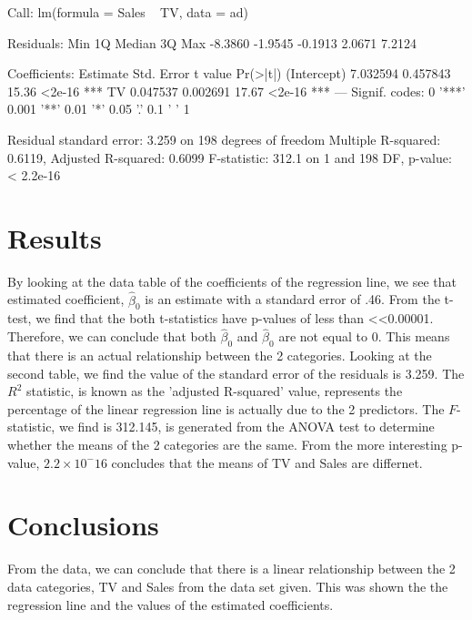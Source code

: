 \documentclass{article}
\begin{document}
\begin{Schunk}
\begin{Soutput}
Call:
lm(formula = Sales ~ TV, data = ad)

Residuals:
    Min      1Q  Median      3Q     Max 
-8.3860 -1.9545 -0.1913  2.0671  7.2124 

Coefficients:
            Estimate Std. Error t value Pr(>|t|)    
(Intercept) 7.032594   0.457843   15.36   <2e-16 ***
TV          0.047537   0.002691   17.67   <2e-16 ***
---
Signif. codes:  0 '***' 0.001 '**' 0.01 '*' 0.05 '.' 0.1 ' ' 1

Residual standard error: 3.259 on 198 degrees of freedom
Multiple R-squared:  0.6119,	Adjusted R-squared:  0.6099 
F-statistic: 312.1 on 1 and 198 DF,  p-value: < 2.2e-16
\end{Soutput}
\end{Schunk}

\section{Results}

By looking at the data table of the coefficients of the regression line, we see that estimated coefficient, $\hat \beta_0$ is an estimate with a standard error of .46.  From the t-test, we find that the both t-statistics have p-values of less than <<0.00001. Therefore, we can conclude that both $\hat \beta_0$ and $\hat \beta_0$ are not equal to 0. This means that there is an actual relationship between the 2 categories.
Looking at the second table, we find the value of the standard error of the residuals is 3.259. The $R^2$ statistic, is known as the 'adjusted R-squared' value, represents the percentage of the linear regression line is actually due to the 2 predictors. The $F$-statistic, we find is 312.145, is generated from the ANOVA test to determine whether the means of the 2 categories are the same.  From the more interesting p-value, $2.2 \times 10^-16$ concludes that the means of TV and Sales are differnet.


\section{Conclusions}

From the data, we can conclude that there is a linear relationship between the 2 data categories, TV and Sales from the data set given.  This was shown the the regression line and the values of the estimated coefficients.  
\end{document}
